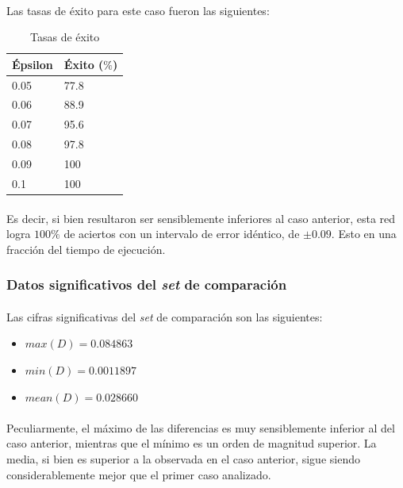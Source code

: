 \documentclass[12pt, twocolumn]{article}
\begin{document}
	\paragraph{} Las tasas de éxito para este caso fueron las siguientes:
	
	\begin{table}[H]
		\centering
		\begin{tabular}{ll}
			\hline
			Épsilon & Éxito ($\%$)\\ \hline
			0.05     & 77.8  \\
			0.06     & 88.9    \\
			0.07     & 95.6  \\
			0.08     & 97.8  \\
			0.09     & 100  \\ 
			0.1      & 100  \\ \hline 
		\end{tabular}
		\caption{Tasas de éxito}
		\label{ex3}
	\end{table}
	
	\paragraph{} Es decir, si bien resultaron ser sensiblemente inferiores al caso anterior, esta red logra $100\%$ de aciertos con un intervalo de error idéntico, de $\pm 0.09$. Esto en una fracción del tiempo de ejecución.
	
	\subsubsection{Datos significativos del \textit{set} de comparación}
	
	\paragraph{} Las cifras significativas del \textit{set} de comparación son las siguientes:
	
	\begin{itemize}
		\item $max(D) = 0.084863$
		\item $min(D) = 0.0011897$
		\item $mean(D) = 0.028660$
	\end{itemize} 
	
	\paragraph{} Peculiarmente, el máximo de las diferencias es muy sensiblemente inferior al del caso anterior, mientras que el mínimo es un orden de magnitud superior. La media, si bien es superior a la observada en el caso anterior, sigue siendo considerablemente mejor que el primer caso analizado. 
	
\end{document}
